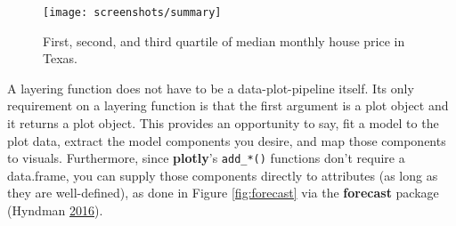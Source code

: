 \documentclass[12pt,]{isuthesis}
\begin{document}
\begin{figure}
\centering
\texttt{[image: screenshots/summary]}
\caption{\label{fig:summary}First, second, and third quartile of median
monthly house price in Texas.}
\end{figure}

A layering function does not have to be a data-plot-pipeline itself. Its
only requirement on a layering function is that the first argument is a
plot object and it returns a plot object. This provides an opportunity
to say, fit a model to the plot data, extract the model components you
desire, and map those components to visuals. Furthermore, since
\textbf{plotly}'s \texttt{add\_*()} functions don't require a
data.frame, you can supply those components directly to attributes (as
long as they are well-defined), as done in Figure \ref{fig:forecast} via
the \textbf{forecast} package (Hyndman
\protect\hyperlink{ref-forecast}{2016}).
\end{document}
